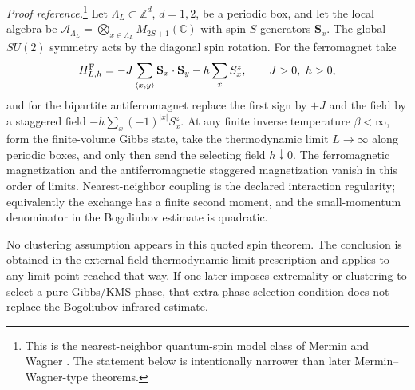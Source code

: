 \begin{quotedtheorem}
\label{qthm:mermin-wagner-heisenberg}
\emph{Proof reference.}\footnote{This is the nearest-neighbor quantum-spin
model class of Mermin and Wagner \cite{MerminWagner1966}.  The statement below
is intentionally narrower than later Mermin--Wagner-type theorems.}
Let \(\Lambda_L\subset\mathbb Z^d\), \(d=1,2\), be a periodic box, and let the
local algebra be
\(\mathcal A_{\Lambda_L}=\bigotimes_{x\in\Lambda_L}M_{2S+1}(\mathbb C)\) with
spin-\(S\) generators \(\mathbf S_x\).  The global \(SU(2)\) symmetry acts by
the diagonal spin rotation.  For the ferromagnet take
\[
  H_{L,h}^{\rm F}
  =
  -J\sum_{\langle x,y\rangle}\mathbf S_x\cdot\mathbf S_y
  -h\sum_x S_x^z,
  \qquad J>0,\ h>0,
\]
and for the bipartite antiferromagnet replace the first sign by \(+J\) and
the field by a staggered field
\(-h\sum_x(-1)^{|x|}S_x^z\).  At any finite inverse temperature
\(\beta<\infty\), form the finite-volume Gibbs state, take the thermodynamic
limit \(L\to\infty\) along periodic boxes, and only then send the selecting
field \(h\downarrow0\).  The ferromagnetic magnetization and the
antiferromagnetic staggered magnetization vanish in this order of limits.
Nearest-neighbor coupling is the declared interaction regularity; equivalently
the exchange has a finite second moment, and the small-momentum denominator in
the Bogoliubov estimate is quadratic.
\end{quotedtheorem}

No clustering assumption appears in this quoted spin theorem.  The conclusion
is obtained in the external-field thermodynamic-limit prescription and applies
to any limit point reached that way.  If one later imposes extremality or
clustering to select a pure Gibbs/KMS phase, that extra phase-selection
condition does not replace the Bogoliubov infrared estimate.

